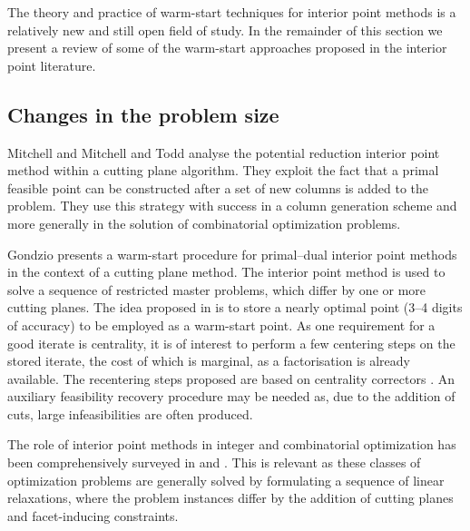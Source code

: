 The theory and practice of warm-start techniques for interior point 
methods is a relatively new and still open field of study.
In the remainder of this section we present a review of some 
of the warm-start approaches proposed in the interior point literature.

%
%
\subsection{Changes in the problem size}

Mitchell \cite{phd:Mitchell} and Mitchell and Todd \cite{MitchellTodd}
analyse the potential reduction interior point method within
a cutting plane algorithm. They exploit the fact that
a primal feasible point can be constructed after a set of new
columns is added to the problem. They use this strategy with success
in a column generation scheme and more generally in the solution 
of combinatorial optimization problems.

Gondzio \cite{Gondzio98} presents a warm-start procedure for 
primal--dual interior point methods in the context of a cutting 
plane method. The interior 
point method is used to solve a sequence of restricted master 
problems, which differ by one or more cutting planes.
%
%
The idea proposed in \cite{Gondzio98} is to store a nearly optimal 
point (3--4 digits of accuracy) to be employed as a warm-start point.
%
%
As one requirement for a good iterate is centrality, it is of interest 
to perform a few centering steps on the stored iterate, the cost of 
which is marginal, as a factorisation is already available. The 
recentering steps proposed are based on
centrality correctors \cite{Gondzio96}.
An auxiliary feasibility recovery procedure may be needed as, due to 
the addition of cuts, large infeasibilities are often produced.

The role of interior point methods in integer and combinatorial 
optimization has been comprehensively surveyed in \cite{Mitchell96} 
and \cite{MitchellPardalosResende98}. This is relevant as these classes
of optimization problems are generally solved by formulating a sequence
of linear relaxations, where the problem instances differ by the
addition of cutting planes and facet-inducing constraints.

